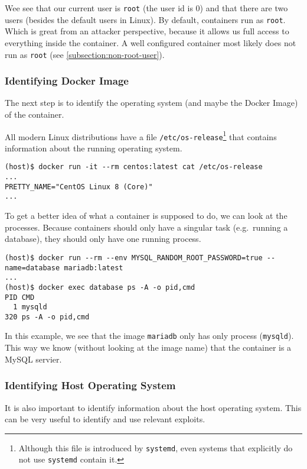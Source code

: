 Wee see that our current user is \lstinline{root} (the user id is 0) and that there are two users (besides the default users in Linux). By default, containers run as \lstinline{root}. Which is great from an attacker perspective, because it allows us full access to everything inside the container. A well configured container most likely does not run as \lstinline{root} (see \autoref{subsection:non-root-user}).

\subsubsection{Identifying Docker Image}

The next step is to identify the operating system (and maybe the Docker Image) of the container.

All modern Linux distributions have a file \lstinline{/etc/os-release}\footnote{Although this file is introduced by \lstinline{systemd}, even systems that explicitly do not use \lstinline{systemd} contain it.} that contains information about the running operating system.
\begin{lstlisting}
(host)$ docker run -it --rm centos:latest cat /etc/os-release
...
PRETTY_NAME="CentOS Linux 8 (Core)"
...
\end{lstlisting}

\hfill

To get a better idea of what a container is supposed to do, we can look at the processes. Because containers should only have a singular task (e.g.\ running a database), they should only have one running process. 

\begin{lstlisting}
(host)$ docker run --rm --env MYSQL_RANDOM_ROOT_PASSWORD=true --name=database mariadb:latest
...
(host)$ docker exec database ps -A -o pid,cmd
PID CMD
  1 mysqld
320 ps -A -o pid,cmd
\end{lstlisting}

In this example, we see that the image \lstinline{mariadb} only has only process (\lstinline{mysqld}). This way we know (without looking at the image name) that the container is a MySQL servier.

\subsubsection{Identifying Host Operating System}
It is also important to identify information about the host operating system. This can be very useful to identify and use relevant exploits. 

